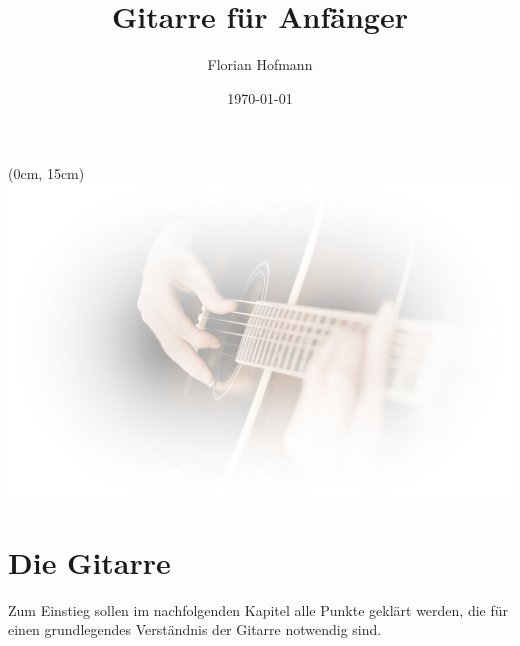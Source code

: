 \documentclass[a4paper, 12pt]{article}
\title{\Huge \textbf{Gitarre für Anfänger}}
\author{Florian Hofmann}
\date{\today}
\begin{document}
    \maketitle
    \tableofcontents
    \begin{textblock*}{\paperwidth}(0cm, 15cm)
    \vfill
    \includegraphics[width=\paperwidth]{pictures/background3}
    \end{textblock*}
    \newpage
    \setcounter{page}{1}
    \section{Die Gitarre}
    Zum Einstieg sollen im nachfolgenden Kapitel alle Punkte geklärt werden, die für einen
    grundlegendes Verständnis der Gitarre notwendig sind.
\end{document}
